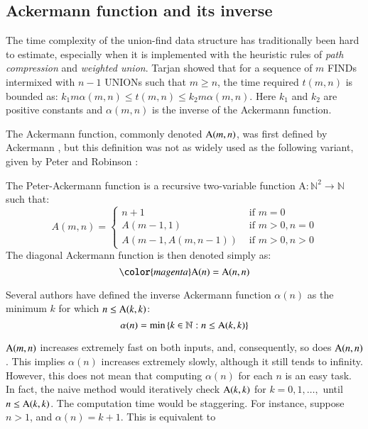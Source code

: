 \subsection{Ackermann function and its inverse}

The time complexity of the union-find data structure has traditionally
been hard to estimate, especially when it is implemented with the 
heuristic rules of \emph{path compression} and \emph{weighted union}. 
Tarjan \cite{tarjan} showed that for a sequence of $m$ FINDs 
intermixed with $n-1$ UNIONs 
such that $m \geq n$, the time required $t(m,n)$ is bounded
as: $k_{1}m\alpha(m,n) \leq t(m,n) \leq k_{2}m\alpha(m,n)$. 
Here $k_{1}$ and $k_{2}$ are positive constants and $\alpha(m,n)$ is 
the inverse of the Ackermann function.

The Ackermann function, commonly denoted $\text{A}(m, n)$, 
was first defined by Ackermann \cite{ackermann}, but this 
definition was not as widely used as the following variant, 
given by Peter and Robinson \cite{peter-ackermann}:

\begin{defn} \label{defn: ack}
The Peter-Ackermann function is a recursive two-variable 
function $\text{A} : \mathbb{N}^2 \to \mathbb{N}$ such that:
\begin{equation}
A(m, n) = \begin{cases}
n + 1 & \text{ if } m = 0 \\
A(m-1, 1) & \text{ if } m > 0, n = 0 \\
A(m-1, A(m, n-1)) & \text{ if } m > 0, n > 0
\end{cases}
\end{equation}
The diagonal Ackermann function is then denoted simply as:
\begin{equation}
{\color{magenta}\Ack(n) = \Ack(n, n)}
\end{equation}
\end{defn}


\begin{defn} \label{defn: inv_ack}
Several authors \cite{blah} have defined the inverse Ackermann 
function $\alpha(n)$ as the minimum $k$ for which $n \le \text{A}(k, k)$:
\begin{equation}
\alpha(n) = \min\left\{k\in \mathbb{N} : n \le \text{A}(k, k)\right\}
\end{equation}
\end{defn}

$\text{A}(m, n)$ increases extremely fast on both inputs, 
and, consequently, so does $\text{A}(n, n)$. 
This implies $\alpha(n)$ increases extremely slowly, 
although it still tends to infinity. However, this does 
not mean that computing $\alpha(n)$ for each $n$ is an easy 
task. In fact, the naive method would iteratively check 
$\text{A}(k, k)$ for $k = 0, 1, \ldots, $ until $n \le \text{A}(k, k)$. 
The computation time would be staggering. 
For instance, suppose $n > 1$, and $\alpha(n) = k+1$. 
This is equivalent to

